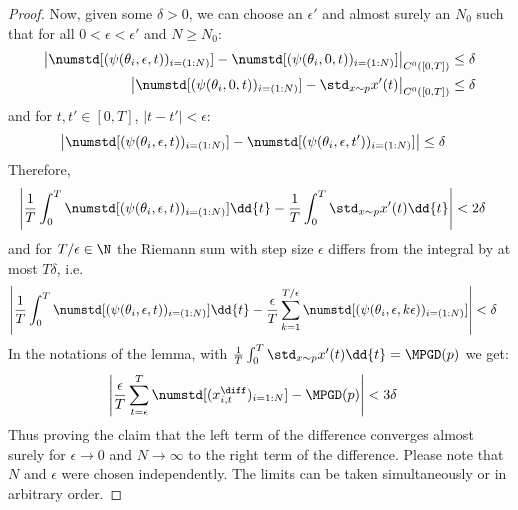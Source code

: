 \begin{proof}
Now, given some $\delta>0$, we can choose an $\epsilon'$ and almost surely an $N_0$ such that
for all $0<\epsilon<\epsilon'$ and $N\geq N_0$:
%
\begin{align}
	\left|
		\numstd[(\psi(\theta_i,\epsilon,t))_{i=(1:N)}]
		- \numstd[(\psi(\theta_i,0,t))_{i=(1:N)}]
	\right|_{C^0([0,T])} &\leq \delta
	\\
	\left|
		\numstd[(\psi(\theta_i,0,t))_{i=(1:N)}]  - \std_{x\sim p} x'(t)
	\right|_{C^0([0,T])}
	&\leq \delta
\end{align}
%
and for $t,t'\in [0,T]$, $|t-t'|<\epsilon$:
%
\begin{align}
	\left|
		\numstd[(\psi(\theta_i,\epsilon,t))_{i=(1:N)}]
		- \numstd[(\psi(\theta_i,\epsilon,t'))_{i=(1:N)}]
	\right|
	&\leq \delta
\end{align}
%
Therefore,
%
\begin{align}
	\left|
		\frac{1}{T} \int_0^T \numstd[(\psi(\theta_i,\epsilon,t))_{i=(1:N)}] \dd{t}
		- \frac{1}{T} \int_0^T \std_{x\sim p} x'(t) \dd{t}
	\right|
	&< 2\delta
\end{align}
%
and for $T/\epsilon\in\N$ the Riemann sum with step size $\epsilon$ differs from the integral by at most $T\delta$, i.e.
%
\begin{align}
	\left|
		\frac{1}{T} \int_0^T \numstd[(\psi(\theta_i,\epsilon,t))_{i=(1:N)}] \dd{t}
		- \frac{\epsilon}{T} \sum_{k=1}^{T/\epsilon} \numstd[(\psi(\theta_i,\epsilon,k\epsilon))_{i=(1:N)}]
	\right|
	&<\delta
\end{align}
%
In the notations of the lemma, with $\frac{1}{T} \int_0^T \std_{x\sim p} x'(t) \dd{t} = \MPGD(p)$ we get:
%
\begin{align}
	\left|
		\frac{\epsilon}{T} \sum_{t=\epsilon}^{T} \numstd[(x^{\diff}_{i,t})_{i=1:N}] - \MPGD(p)
	\right|
	&< 3\delta
\end{align}
%
Thus proving the claim that the left term of the difference converges almost surely for $\epsilon\to 0 $ and $N\to\infty$ to the right term of the difference.
Please note that $N$ and $\epsilon$ were chosen independently. The limits can be taken simultaneously or in arbitrary order.
%

\end{proof}
